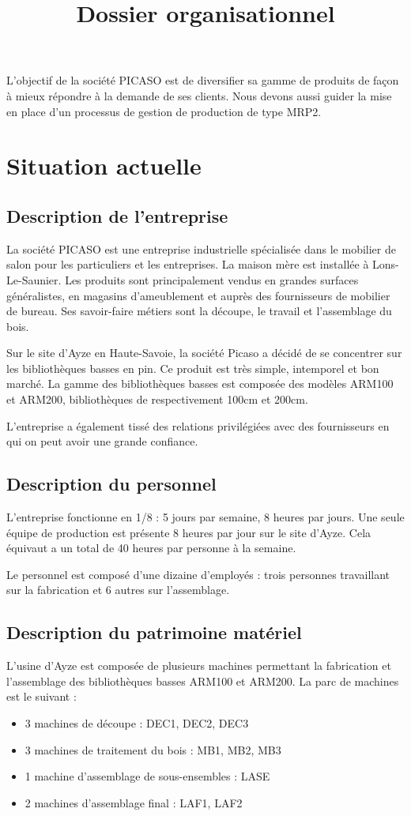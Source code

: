 \documentclass[a4paper]{../TPInsa}
\title{Dossier organisationnel}
\begin{document}
	\pageTitre
	\tableMatieres

		L'objectif de la société PICASO est de diversifier sa gamme de produits de façon à mieux répondre à la demande de ses clients. Nous devons aussi guider la mise en place d'un processus de gestion de production de type MRP2.	
	
	\section{Situation actuelle}
	
	\subsection{Description de l'entreprise}
	
	La société PICASO est une entreprise industrielle spécialisée dans le mobilier de salon pour les particuliers et les entreprises. La maison mère est installée à Lons-Le-Saunier. Les produits sont principalement vendus en grandes surfaces généralistes, en magasins d'ameublement et auprès des fournisseurs de mobilier de bureau. Ses savoir-faire métiers sont la découpe, le travail et l'assemblage du bois.
	
	Sur le site d'Ayze en Haute-Savoie, la société Picaso a décidé de se concentrer sur les bibliothèques basses en pin. Ce produit est très simple, intemporel et bon marché. La gamme des bibliothèques basses est composée des modèles ARM100 et ARM200, bibliothèques de respectivement 100cm et 200cm.  
	
	
	L'entreprise a également tissé des relations privilégiées avec des fournisseurs en qui on peut avoir une grande confiance. 
	
	\subsection{Description du personnel}
	L'entreprise fonctionne en 1/8 : 5 jours par semaine, 8 heures par jours. Une seule équipe de production est présente 8 heures par jour sur le site d'Ayze. Cela équivaut a un total de 40 heures par personne à la semaine. 
	
	Le personnel est composé d'une dizaine d'employés : trois personnes travaillant sur la fabrication et 6 autres sur l'assemblage. 
	\subsection{Description du patrimoine matériel}
	L'usine d'Ayze est composée de plusieurs machines permettant la fabrication et l'assemblage des bibliothèques basses ARM100 et ARM200. 
	La parc de machines est le suivant :
	\begin{itemize}
	\item 3 machines de découpe : DEC1, DEC2, DEC3
	\item 3 machines de traitement du bois : MB1, MB2, MB3
	\item 1 machine d'assemblage de sous-ensembles : LASE
	\item 2 machines d'assemblage final : LAF1, LAF2
	\end{itemize}
	
\end{document}
